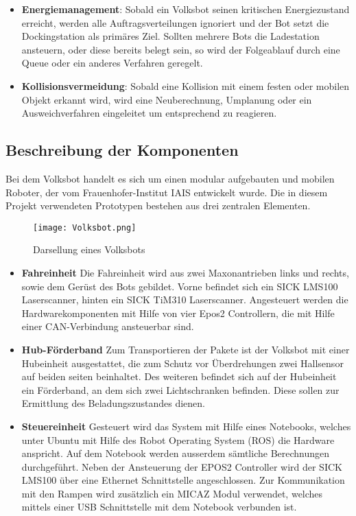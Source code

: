 \begin{itemize}
\item \textbf{Energiemanagement}: Sobald ein Volksbot seinen kritischen Energiezustand erreicht, werden alle Auftragsverteilungen ignoriert und der Bot setzt die Dockingstation als primäres Ziel. Sollten mehrere Bots die Ladestation ansteuern, oder diese bereits belegt sein, so wird der Folgeablauf durch eine Queue oder ein anderes Verfahren geregelt.

\item \textbf{Kollisionsvermeidung}: Sobald eine Kollision mit einem festen oder mobilen Objekt erkannt wird, wird eine Neuberechnung, Umplanung oder ein Ausweichverfahren eingeleitet um entsprechend zu reagieren.

\end{itemize}



\subsection{Beschreibung der Komponenten}

Bei dem Volksbot handelt es sich um einen modular aufgebauten und mobilen Roboter, der vom Frauenhofer-Institut IAIS entwickelt wurde. Die in diesem Projekt verwendeten Prototypen bestehen aus drei zentralen Elementen. 

	\begin{figure}[h!]
		\centering
			\texttt{[image: Volksbot.png]}
			\caption{Darsellung eines Volksbots}
			\label{Volksbot}
	\end{figure}	

\begin{itemize}

\item \textbf{Fahreinheit}
Die Fahreinheit wird aus zwei Maxonantrieben links und rechts, sowie dem Gerüst des Bots gebildet. Vorne befindet sich ein SICK LMS100 Laserscanner,  hinten ein SICK TiM310 Laserscanner. Angesteuert werden die Hardwarekomponenten mit Hilfe von vier Epos2 Controllern, die mit Hilfe einer CAN-Verbindung ansteuerbar sind. 

\item \textbf{Hub-Förderband}
Zum Transportieren der Pakete ist der Volksbot mit einer Hubeinheit ausgestattet, die zum Schutz vor Überdrehungen zwei Hallsensor auf beiden seiten beinhaltet. Des weiteren befindet sich auf der Hubeinheit ein Förderband, an dem sich zwei Lichtschranken befinden. Diese sollen zur Ermittlung des Beladungszustandes dienen. 

\item \textbf{Steuereinheit}
Gesteuert wird das System mit Hilfe eines Notebooks, welches unter Ubuntu mit Hilfe des Robot Operating System (ROS) die Hardware anspricht. Auf dem Notebook werden ausserdem sämtliche 
Berechnungen durchgeführt. Neben der Ansteuerung der EPOS2 Controller wird der SICK LMS100 über eine Ethernet Schnittstelle angeschlossen. Zur Kommunikation mit den Rampen wird zusätzlich ein MICAZ Modul verwendet, welches mittels einer USB Schnittstelle mit dem Notebook verbunden ist.

\end{itemize}
